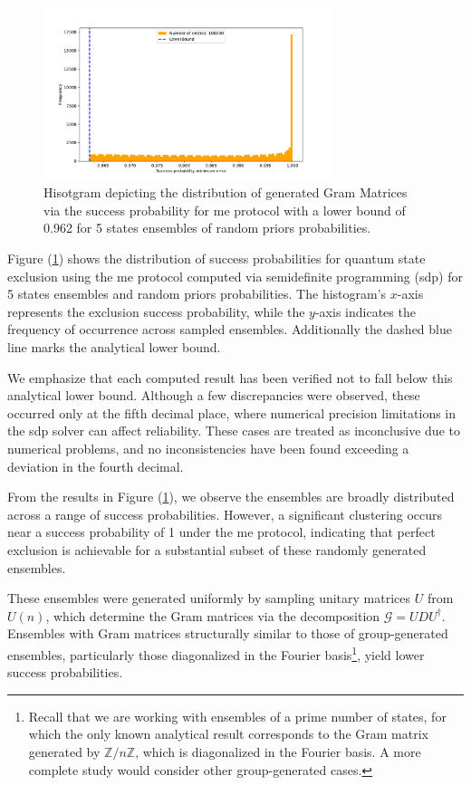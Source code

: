 \documentclass[12pt,letterpaper]{article}
\begin{document}
\begin{figure}[H]
	\centering
	\includegraphics[width=0.75\textwidth, trim={1.0cm 0.3cm 2.4cm 1.5cm}, clip]{../Plots/ExclusionMinimumErrorRandomDistributionZ3Prob0.962.pdf}
	\caption{Hisotgram depicting the distribution of generated Gram Matrices via the success probability for \gls{me} protocol with a lower bound of 0.962 for 5 states ensembles of random priors probabilities.}
	\label{FigureDistZ5ME0.962}
\end{figure}

Figure (\ref{FigureDistZ5ME0.962}) shows the distribution of success probabilities for quantum state exclusion using the \gls{me} protocol computed via semidefinite programming (\gls{sdp}) for 5 states ensembles and random priors probabilities. The histogram's $x$-axis represents the exclusion success probability, while the $y$-axis indicates the frequency of occurrence across sampled ensembles. Additionally the dashed blue line marks the analytical lower bound.

We emphasize that each computed result has been verified not to fall below this analytical lower bound. Although a few discrepancies were observed, these occurred only at the fifth decimal place, where numerical precision limitations in the \gls{sdp} solver can affect reliability. These cases are treated as inconclusive due to numerical problems, and no inconsistencies have been found exceeding a deviation in the fourth decimal.

From the results in Figure (\ref{FigureDistZ5ME0.962}), we observe the ensembles are broadly distributed across a range of success probabilities. However, a significant clustering occurs near a success probability of 1 under the \gls{me} protocol, indicating that perfect exclusion is achievable for a substantial subset of these randomly generated ensembles.

These ensembles were generated uniformly by sampling unitary matrices $ U $ from $U(n)$, which determine the Gram matrices via the decomposition $\mathcal{G} = U D U^\dagger$. Ensembles with Gram matrices structurally similar to those of group-generated ensembles, particularly those diagonalized in the Fourier basis\footnote{Recall that we are working with ensembles of a prime number of states, for which the only known analytical result corresponds to the Gram matrix generated by $\mathbb{Z}/n\mathbb{Z}$, which is diagonalized in the Fourier basis. A more complete study would consider other group-generated cases.}, yield lower success probabilities. 
\end{document}
